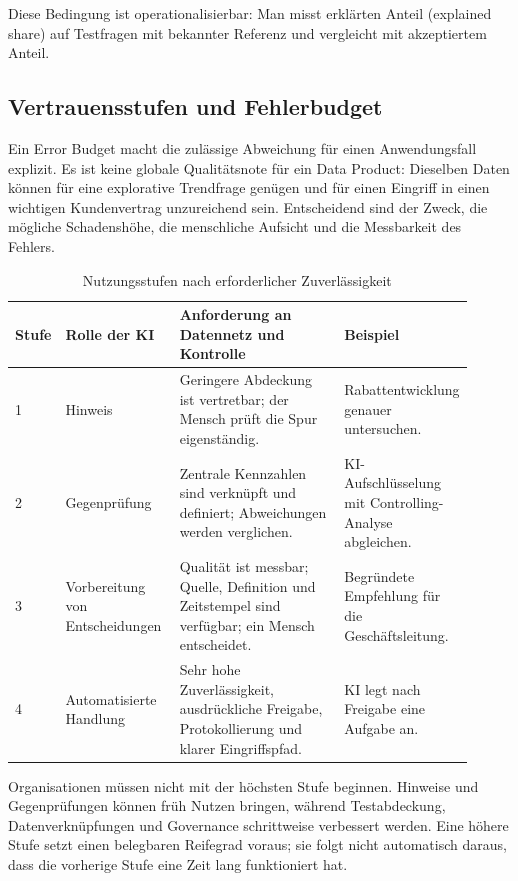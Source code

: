 \documentclass[a4paper,12pt]{article}
\theoremstyle{definition}
\begin{document}
Diese Bedingung ist operationalisierbar: Man misst erklärten Anteil (explained share) auf Testfragen mit bekannter Referenz und vergleicht mit akzeptiertem Anteil.

\subsection{Vertrauensstufen und Fehlerbudget}
Ein Error Budget macht die zulässige Abweichung für einen Anwendungsfall explizit. Es ist keine globale Qualitätsnote für ein Data Product: Dieselben Daten können für eine explorative Trendfrage genügen und für einen Eingriff in einen wichtigen Kundenvertrag unzureichend sein. Entscheidend sind der Zweck, die mögliche Schadenshöhe, die menschliche Aufsicht und die Messbarkeit des Fehlers.

\begin{table}[htbp]
\centering
\small
\caption{Nutzungsstufen nach erforderlicher Zuverlässigkeit}
\label{tab:reliability-levels}
\begin{tabular}{p{0.08\linewidth}p{0.25\linewidth}p{0.37\linewidth}p{0.21\linewidth}}
\toprule
\textbf{Stufe} & \textbf{Rolle der KI} & \textbf{Anforderung an Datennetz und Kontrolle} & \textbf{Beispiel} \\
\midrule
1 & Hinweis & Geringere Abdeckung ist vertretbar; der Mensch prüft die Spur eigenständig. & Rabattentwicklung genauer untersuchen. \\
2 & Gegenprüfung & Zentrale Kennzahlen sind verknüpft und definiert; Abweichungen werden verglichen. & KI-Aufschlüsselung mit Controlling-Analyse abgleichen. \\
3 & Vorbereitung von Entscheidungen & Qualität ist messbar; Quelle, Definition und Zeitstempel sind verfügbar; ein Mensch entscheidet. & Begründete Empfehlung für die Geschäftsleitung. \\
4 & Automatisierte Handlung & Sehr hohe Zuverlässigkeit, ausdrückliche Freigabe, Protokollierung und klarer Eingriffspfad. & KI legt nach Freigabe eine Aufgabe an. \\
\bottomrule
\end{tabular}
\end{table}

Organisationen müssen nicht mit der höchsten Stufe beginnen. Hinweise und Gegenprüfungen können früh Nutzen bringen, während Testabdeckung, Datenverknüpfungen und Governance schrittweise verbessert werden. Eine höhere Stufe setzt einen belegbaren Reifegrad voraus; sie folgt nicht automatisch daraus, dass die vorherige Stufe eine Zeit lang funktioniert hat.
\end{document}
